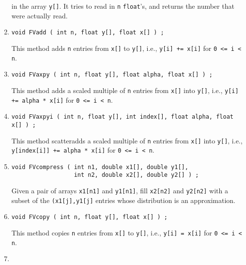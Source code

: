 \begin{enumerate}
in the array {\tt y[]}.
It tries to read in {\tt n} {\tt float}'s, and returns the number
that were actually read.
\item
\begin{verbatim}
void FVadd ( int n, float y[], float x[] ) ;
\end{verbatim}
This method adds {\tt n} entries from {\tt x[]} to {\tt y[]},
i.e.,
{\tt y[i] += x[i]} for {\tt 0 <= i < n}.
\item
\begin{verbatim}
void FVaxpy ( int n, float y[], float alpha, float x[] ) ;
\end{verbatim}
This method adds a scaled multiple of {\tt n} entries from {\tt x[]} 
into {\tt y[]},
i.e.,
{\tt y[i] += alpha * x[i]} for {\tt 0 <= i < n}.
\item
\begin{verbatim}
void FVaxpyi ( int n, float y[], int index[], float alpha, float x[] ) ;
\end{verbatim}
This method scatteradds 
a scaled multiple of {\tt n} entries from {\tt x[]} 
into {\tt y[]},
i.e.,
{\tt y[index[i]] += alpha * x[i]} for {\tt 0 <= i < n}.
\item
\begin{verbatim}
void FVcompress ( int n1, double x1[], double y1[],
                  int n2, double x2[], double y2[] ) ;
\end{verbatim}
Given a pair of arrays {\tt x1[n1]} and {\tt y1[n1]},
fill {\tt x2[n2]} and {\tt y2[n2]} with a subset of the
{\tt (x1[j],y1[j]} entries whose distribution is an approximation.
\item
\begin{verbatim}
void FVcopy ( int n, float y[], float x[] ) ;
\end{verbatim}
This method copies {\tt n} entries from {\tt x[]} to {\tt y[]},
i.e.,
{\tt y[i] = x[i]} for {\tt 0 <= i < n}.
\item
\begin{verbatim}

\end{verbatim}
\end{enumerate}
